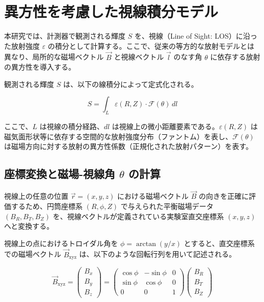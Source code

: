 \documentclass[a4paper,11pt]{jsarticle}
\begin{document}
\section{異方性を考慮した視線積分モデル}

本研究では、計測器で観測される輝度 $S$ を、視線（Line of Sight: LOS）に沿った放射強度 $\varepsilon$ の積分として計算する。ここで、従来の等方的な放射モデルとは異なり、局所的な磁場ベクトル $\vec{B}$ と視線ベクトル $\vec{l}$ のなす角 $\theta$ に依存する放射の異方性を導入する。

観測される輝度 $S$ は、以下の線積分によって定式化される。

\begin{equation}
    S = \int_{L} \varepsilon(R, Z) \cdot \mathcal{F}(\theta) \, dl
\end{equation}

ここで、$L$ は視線の積分経路、$dl$ は視線上の微小距離要素である。$\varepsilon(R, Z)$ は磁気面形状等に依存する空間的な放射強度分布（ファントム）を表し、$\mathcal{F}(\theta)$ は磁場方向に対する放射の異方性係数（正規化された放射パターン）を表す。

\subsection{座標変換と磁場-視線角 $\theta$ の計算}

視線上の任意の位置 $\vec{r} = (x, y, z)$ における磁場ベクトル $\vec{B}$ の向きを正確に評価するため、円筒座標系 $(R, \phi, Z)$ で与えられた平衡磁場データ $(B_R, B_T, B_Z)$ を、視線ベクトルが定義されている実験室直交座標系 $(x, y, z)$ へと変換する。

視線上の点におけるトロイダル角を $\phi = \arctan(y/x)$ とすると、直交座標系での磁場ベクトル $\vec{B}_{\mathrm{xyz}}$ は、以下のような回転行列を用いて記述される。

\begin{equation}
    \vec{B}_{\mathrm{xyz}} = 
    \begin{pmatrix}
        B_x \\
        B_y \\
        B_z
    \end{pmatrix}
    =
    \begin{pmatrix}
        \cos\phi & -\sin\phi & 0 \\
        \sin\phi & \cos\phi & 0 \\
        0 & 0 & 1
    \end{pmatrix}
    \begin{pmatrix}
        B_R \\
        B_T \\
        B_Z
    \end{pmatrix}
\end{equation}
\end{document}
